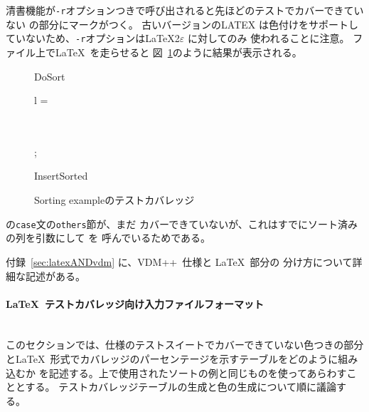 \documentclass[\pformat,12pt]{jarticle}
\newcommand{\vdmslpp}{VDM++}
\newcommand{\subsubsubsection}[1]{\paragraph{#1}\mbox{}\\}
\begin{document}
清書機能が{\tt -r}オプションつきで呼び出されると先ほどのテストでカバーできていない
 の部分にマークがつく。
古いバージョンのLATEX は色付けをサポートしていないため、{\tt -r}オプションは\LaTeX2$\varepsilon$ に対してのみ
使われることに注意。
ファイル上で\LaTeX\ を走らせると
図~\ref{fig:tc-sort}のように結果が表示される。

\begin{figure}[tbh]
\small{
\begin{vdm}
\begin{fn}[e]{DoSort}%
\signature{\seqof*{\Real } \To \seqof*{\Real }}
\If l = \seq{}
\Then\\ \seq{}
\Else\\ \begin{letexpr}
\end{letexpr}\\
\Fi;\\
\end{fn}
\begin{fn}[e]{InsertSorted}%
\signature{PosReal \Mult {} \To {}}
\begin{Cases}{\True }
\end{Cases}
\end{fn}
\end{vdm}}
\caption{Sorting exampleのテストカバレッジ}
\label{fig:tc-sort}
\end{figure}


 の{\tt case}文の{\tt others}節が、まだ
カバーできていないが、これはすでにソート済みの列を引数にして
 を
呼んでいるためである。

付録~\ref{sec:latexANDvdm} に、\vdmslpp\ 仕様と \LaTeX\ 部分の
分け方について詳細な記述がある。

\subsubsubsection{\LaTeX\ テストカバレッジ向け入力ファイルフォーマット}

このセクションでは、仕様のテストスイートでカバーできていない色つきの部分
と\LaTeX\ 形式でカバレッジのパーセンテージを示すテーブルをどのように組み込むか
を記述する。上で使用されたソートの例と同じものを使ってあらわすこととする。
テストカバレッジテーブルの生成と色の生成について順に議論する。
\end{document}
